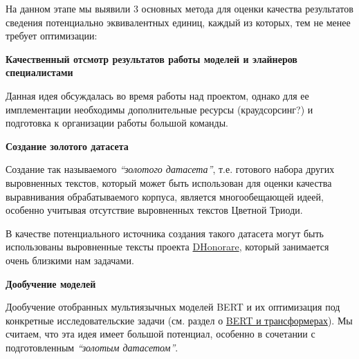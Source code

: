 \documentclass[
  letterpaper,
]{book}
\begin{document}
На данном этапе мы выявили 3 основных метода для оценки качества
результатов сведения потенциально эквивалентных единиц, каждый из
которых, тем не менее требует оптимизации:

\begin{tcolorbox}[enhanced jigsaw, opacityback=0, toprule=.15mm, breakable, arc=.35mm, colback=white, left=2mm, bottomrule=.15mm, leftrule=.75mm, colframe=quarto-callout-note-color-frame, rightrule=.15mm]

\textbf{Качественный отсмотр результатов работы моделей и элайнеров
специалистами}\vspace{2mm}

Данная идея обсуждалась во время работы над проектом, однако для ее
имплементации необходимы дополнительные ресурсы (краудсорсинг?) и
подготовка к организации работы большой команды.

\end{tcolorbox}

\begin{tcolorbox}[enhanced jigsaw, opacityback=0, toprule=.15mm, breakable, arc=.35mm, colback=white, left=2mm, bottomrule=.15mm, leftrule=.75mm, colframe=quarto-callout-note-color-frame, rightrule=.15mm]

\textbf{Создание золотого датасета}\vspace{2mm}

Создание так называемого \emph{``золотого датасета''}, т.е. готового
набора других выровненных текстов, который может быть использован для
оценки качества выравнивания обрабатываемого корпуса, является
многообещающей идеей, особенно учитывая отсутствие выровненных текстов
Цветной Триоди.

В качестве потенциального источника создания такого датасета могут быть
использованы выровненные тексты проекта
\href{https://dhonorare.ru/texts/trebnik/molitvy-v-pervyy-den-posle-rozhdeniya-mladentsa}{DHonorare},
который занимается очень близкими нам задачами.

\end{tcolorbox}

\begin{tcolorbox}[enhanced jigsaw, opacityback=0, toprule=.15mm, breakable, arc=.35mm, colback=white, left=2mm, bottomrule=.15mm, leftrule=.75mm, colframe=quarto-callout-note-color-frame, rightrule=.15mm]

\textbf{Дообучение моделей}\vspace{2mm}

Дообучение отобранных мультиязычных моделей BERT и их оптимизация под
конкретные исследовательские задачи (см. раздел о
\protect\hyperlink{sec-about_bert}{BERT и трансформерах}). Мы считаем,
что эта идея имеет большой потенциал, особенно в сочетании с
подготовленным \emph{``золотым датасетом''}.

\end{tcolorbox}
\end{document}
